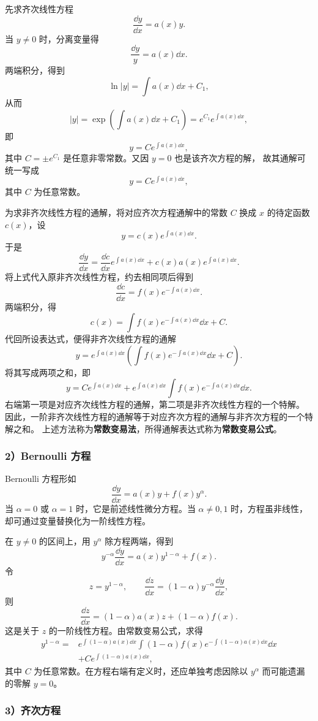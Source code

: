 先求齐次线性方程
\[
	\dfrac{\dd y}{\dd x}=a(x)y.
\]
当 $y\neq 0$ 时，分离变量得
\[
	\dfrac{\dd y}{y}=a(x)\dd x.
\]
两端积分，得到
\[
	\ln|y|=\int a(x)\dd x+C_1,
\]
从而
\[
	|y|=\exp\left(\int a(x)\dd x+C_1\right)
	=e^{C_1}e^{\int a(x)\dd x},
\]
即
\[
	y=Ce^{\int a(x)\dd x},
\]
其中 $C=\pm e^{C_1}$ 是任意非零常数。又因 $y=0$ 也是该齐次方程的解，
故其通解可统一写成
\[
	y=Ce^{\int a(x)\dd x},
\]
其中 $C$ 为任意常数。


为求非齐次线性方程的通解，将对应齐次方程通解中的常数 $C$
换成 $x$ 的待定函数 $c(x)$，设
\[
	y=c(x)e^{\int a(x)\dd x}.
\]
于是
\[
	\dfrac{\dd y}{\dd x}
	=\dfrac{\dd c}{\dd x}e^{\int a(x)\dd x}
	+c(x)a(x)e^{\int a(x)\dd x}.
\]
将上式代入原非齐次线性方程，约去相同项后得到
\[
	\dfrac{\dd c}{\dd x}=f(x)e^{-\int a(x)\dd x}.
\]
两端积分，得
\[
	c(x)=\int f(x)e^{-\int a(x)\dd x}\dd x+C.
\]
代回所设表达式，便得非齐次线性方程的通解
\[
	y=e^{\int a(x)\dd x}
	\left(\int f(x)e^{-\int a(x)\dd x}\dd x+C\right).
\]
将其写成两项之和，即
\[
	y=Ce^{\int a(x)\dd x}
	+e^{\int a(x)\dd x}\int f(x)e^{-\int a(x)\dd x}\dd x.
\]
右端第一项是对应齐次线性方程的通解，第二项是非齐次线性方程的一个特解。
因此，一阶非齐次线性方程的通解等于对应齐次方程的通解与非齐次方程的一个特解之和。
上述方法称为\textbf{常数变易法}，所得通解表达式称为\textbf{常数变易公式}。

\subsubsection*{2）Bernoulli 方程}

Bernoulli 方程形如
\[
	\dfrac{\dd y}{\dd x}=a(x)y+f(x)y^\alpha.
\]
当 $\alpha=0$ 或 $\alpha=1$ 时，它是前述线性微分方程。当
$\alpha\neq 0,1$ 时，方程虽非线性，却可通过变量替换化为一阶线性方程。

在 $y\neq 0$ 的区间上，用 $y^\alpha$ 除方程两端，得到
\[
	y^{-\alpha}\dfrac{\dd y}{\dd x}=a(x)y^{1-\alpha}+f(x).
\]
令
\[
	z=y^{1-\alpha},
	\qquad
	\dfrac{\dd z}{\dd x}=(1-\alpha)y^{-\alpha}\dfrac{\dd y}{\dd x},
\]
则
\[
	\dfrac{\dd z}{\dd x}=(1-\alpha)a(x)z+(1-\alpha)f(x).
\]
这是关于 $z$ 的一阶线性方程。由常数变易公式，求得
\[
	\begin{aligned}
	y^{1-\alpha}
	={}&e^{\int(1-\alpha)a(x)\dd x}
	\int(1-\alpha)f(x)e^{-\int(1-\alpha)a(x)\dd x}\dd x\\
	&+Ce^{\int(1-\alpha)a(x)\dd x},
	\end{aligned}
\]
其中 $C$ 为任意常数。在方程右端有定义时，还应单独考虑因除以 $y^\alpha$
而可能遗漏的零解 $y=0$。

\subsubsection*{3）齐次方程}

